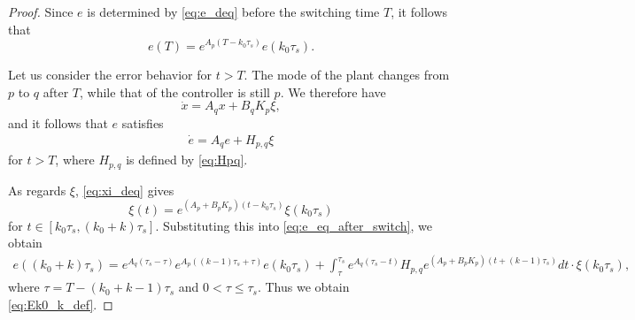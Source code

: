 \documentclass[letterpaper, 11pt, onecolumn]{ieeeconf}  \IEEEoverridecommandlockouts
\begin{document}
\begin{proof}
Since 
$e$ is determined by
\eqref{eq:e_deq} before the switching time $T$, 
it follows that
\[
e(T) = e^{A_p(T-k_0\tau_s)} e(k_0\tau_s).
\]

Let us consider the error behavior for $t > T$.
The mode of the plant changes from $p$ to $q$ after $T$, 
while that of the controller is still $p$. We therefore have
\begin{equation}
\label{eq:x_de_switch}
\dot x = A_qx + B_qK_p \xi,
\end{equation}
and it follows that $e$ satisfies
\begin{align}
\dot e 
= A_q e + H_{p,q} \xi \label{eq:e_eq_after_switch}
\end{align}
for $t > T$, 
where $H_{p,q}$ is defined by \eqref{eq:Hpq}.



As regards $\xi$, \eqref{eq:xi_deq} gives
\begin{equation}
\label{eq:xi_with_switch}
\xi (t) = e^{(A_p+B_pK_p)(t-k_0\tau_s)} \xi(k_0\tau_s)
\end{equation}
for $t \in [k_0\tau_s, (k_0+k)\tau_s]$.
Substituting this into \eqref{eq:e_eq_after_switch}, we obtain
\begin{align*}
e((k_0+k) \tau_s) 
=
e^{A_q(\tau_s - \tau)} e^{A_p((k-1)\tau_s + \tau)} e(k_0\tau_s)+
\int^{\tau_s}_{\tau}
e^{A_q(\tau_s - t)}H_{p,q} e^{(A_p+B_pK_p)(t+(k-1)\tau_s )} dt 
\cdot \xi(k_0\tau_s), 
\end{align*}
where $\tau = T - (k_0 + k-1)\tau_s$ and $0 < \tau \leq \tau_s$. 
Thus we obtain \eqref{eq:Ek0_k_def}.
\end{proof}
\end{document}
